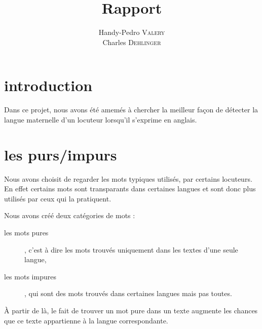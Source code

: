 \documentclass[a4paper]{article}
\title{Rapport}
\author{ Handy-Pedro \textsc{Valery}\\
  Charles \textsc{Dehlinger}\\
}
\begin{document}
\maketitle

\tableofcontents

\section{introduction}
Dans ce projet, nous avons été amemés à chercher la meilleur façon de
détecter la langue maternelle d'un locuteur lorsqu'il s'exprime en
anglais. 

\section{les purs/impurs}
Nous avons choisit de regarder les mots typiques utilisés, par
certains locuteurs. En effet certains mots sont transparants dans
certaines langues et sont donc plus utilisés par ceux qui la
pratiquent.

Nous avons créé deux catégories de mots :
\begin{description}
\item[les mots pures], c'est à dire les mots trouvés uniquement dans
  les textes d'une seule langue,
\item[les mots impures], qui sont des mots trouvés dans certaines
  langues mais pas toutes.
\end{description}
À partir de là, le fait de trouver un mot pure dans un texte augmente
les chances que ce texte appartienne à la langue correspondante.
\end{document}
